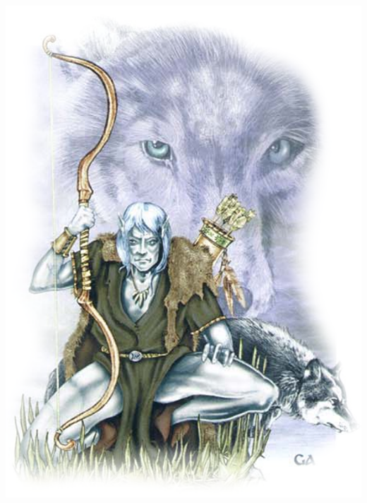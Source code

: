 \documentclass[a4paper,10pt,twoside,twocolumn, bg=print]{dndbook} %
\begin{document}
	\includegraphics[width=\linewidth]{lythari2.png}
\end{document}

